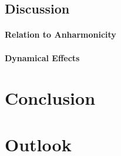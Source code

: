 \documentclass[a4paper,12pt]{book}
\begin{document}
\section{Discussion}
\subsubsection{Relation to Anharmonicity}
\subsubsection{Dynamical Effects}

\chapter{Conclusion}

\chapter{Outlook}



\end{document}

